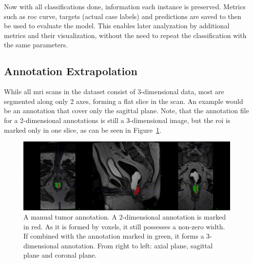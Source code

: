 Now with all classifications done, information each instance is preserved. 
Metrics such as \ac{roc} curve, targets (actual case labels) and predictions 
are saved to then be used to evaluate the model. This enables later analyzation
by additional metrics and their visualization, without the need to repeat the 
classification with the same parameters.

\subsection{Annotation Extrapolation}\label{sec:3d_and_2d}


While all \ac{mri} scans in the dataset consist of 3-dimensional data, 
most are segmented along only 2 axes, forming a flat slice in the scan.
An example would be an annotation that cover only the sagittal plane. 
Note, that the annotation file for 
a 2-dimensional annotations is still a 3-dimensional image, but the 
\ac{roi} is marked only in one slice, as can be seen in Figure~\ref{fig:2dvs3d}.

\begin{figure}[H]
    \centering
    \includegraphics[width=1.0\textwidth]{img/mo0501229884a_marked.png}
    \caption{A manual tumor annotation. A 2-dimensional annotation is marked in red. As it is formed by voxels, it still possesses a non-zero width. If combined with the annotation marked in green, it forms a 3-dimensional annotation. From right to left: axial plane, sagittal plane and coronal plane.}\label{fig:2dvs3d}
\end{figure}

